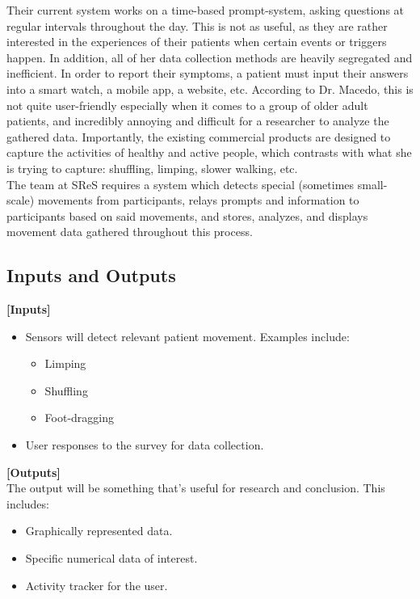 \documentclass[12pt]{article}
\begin{document}
Their current system works on a time-based prompt-system, asking questions at regular intervals throughout the day. This is not as useful, as they are rather interested in the experiences of their patients when certain events or triggers happen. In addition, all of her data collection methods are heavily segregated and inefficient. In order to report their symptoms, a patient must input their answers into a smart watch, a mobile app, a website, etc. According to Dr. Macedo, this is not quite user-friendly especially when it comes to a group of older adult patients, and incredibly annoying and difficult for a researcher to analyze the gathered data. Importantly, the existing commercial products are designed to capture the activities of healthy and active people, which contrasts with what she is trying to capture: shuffling, limping, slower walking, etc.\\

The team at SReS requires a system which detects special (sometimes small-scale) movements from participants, relays prompts and information to participants based on said movements, and stores, analyzes, and displays movement data gathered throughout this process.\\

\pagebreak

\subsection{Inputs and Outputs}

\textbf{[Inputs]}
\begin{itemize}
    \item Sensors will detect relevant patient movement. Examples include:
	\begin{itemize}
		\item Limping
		\item Shuffling
		\item Foot-dragging
	\end{itemize}
    \item User responses to the survey for data collection.
\end{itemize}

\textbf{[Outputs]} \\
\linebreak
The output will be something that's useful for research and conclusion. This includes:
\begin{itemize}
    \item Graphically represented data.
    \item Specific numerical data of interest.
    \item Activity tracker for the user.
\end{itemize}
\end{document}
